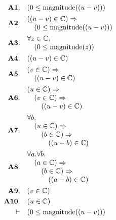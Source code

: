 \documentclass[11pt]{article}
\theoremstyle{plain}
\begin{document}
\begin{align*}
  \mathbf{A1.}\quad & (0 \leq \operatorname{magnitude}((u - v))) \\
  \mathbf{A2.}\quad & \begin{array}{@{}l@{}} ((u - v) \in \mathbb{C}) \Rightarrow  \\ \quad (0 \leq \operatorname{magnitude}((u - v))) \end{array} \\
  \mathbf{A3.}\quad & \begin{array}{@{}l@{}} \forall z \in \mathbb{C}. \\ \quad (0 \leq \operatorname{magnitude}(z)) \end{array} \\
  \mathbf{A4.}\quad & ((u - v) \in \mathbb{C}) \\
  \mathbf{A5.}\quad & \begin{array}{@{}l@{}} (v \in \mathbb{C}) \Rightarrow  \\ \quad ((u - v) \in \mathbb{C}) \end{array} \\
  \mathbf{A6.}\quad & \begin{array}{@{}l@{}} (u \in \mathbb{C}) \Rightarrow  \\ \quad (v \in \mathbb{C}) \Rightarrow  \\ \quad \quad ((u - v) \in \mathbb{C}) \end{array} \\
  \mathbf{A7.}\quad & \begin{array}{@{}l@{}} \forall b. \\ \quad (u \in \mathbb{C}) \Rightarrow  \\ \quad \quad (b \in \mathbb{C}) \Rightarrow  \\ \quad \quad \quad ((u - b) \in \mathbb{C}) \end{array} \\
  \mathbf{A8.}\quad & \begin{array}{@{}l@{}} \forall a. \forall b. \\ \quad (a \in \mathbb{C}) \Rightarrow  \\ \quad \quad (b \in \mathbb{C}) \Rightarrow  \\ \quad \quad \quad ((a - b) \in \mathbb{C}) \end{array} \\
  \mathbf{A9.}\quad & (v \in \mathbb{C}) \\
  \mathbf{A10.}\quad & (u \in \mathbb{C}) \\
  \vdash\quad & (0 \leq \operatorname{magnitude}((u - v)))
\end{align*}
\end{document}
